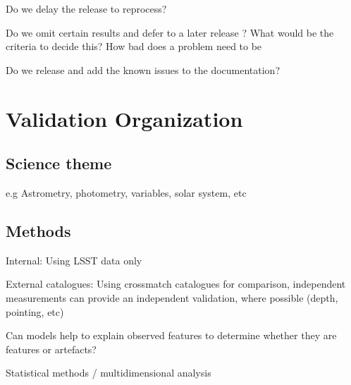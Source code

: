 Do we delay the release to reprocess?

Do we omit certain results and defer to a later release ? What would be the criteria to decide this? How bad does a problem need to be

Do we release and add the known issues to the documentation?

\section{Validation Organization}

\subsection{Science theme}
e.g Astrometry, photometry, variables, solar system, etc 	


\subsection{Methods}
Internal: Using LSST data only

External catalogues: Using crossmatch catalogues for comparison, independent measurements can provide an independent validation, where possible (depth, pointing, etc)

Can  models help to explain observed features to determine whether they are features or artefacts?

Statistical methods / multidimensional analysis 

	